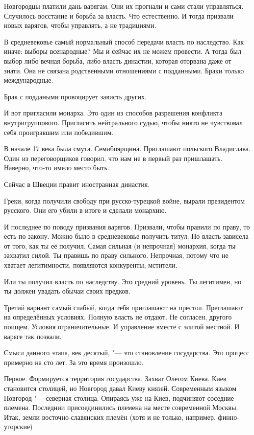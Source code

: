 Новгородцы платили дань варягам. Они их прогнали и сами стали управляться. Случилось восстание и борьба за власть. Что естественно. И тогда призвали новых варягов, чтобы управлять, а не традициями.

В средневековье самый нормальный способ передачи власть по наследство. Как иначе: выборы всенародные? Мы и сейчас их не можем провести. А тогда был выбор либо вечная борьба, либо власть династии, которая оторвана даже от знати. Она не связана родственными отношениями с подданными. Браки только международные.

Брак с поддаными провоцирует зависть других.

И вот пригласили монарха. Это один из способов разрешения конфликта внутригруппового. Пригласить нейтрального судью, чтобы никто не чувствовал себя проигравшим или победившим.

В начале 17 века была смута. Семибоярщина. Приглашают польского Владислава. Один из переговорщиков говорил, что нам не в первый раз пришлашать. Наверно, что-то имело место быть.

Сейчас в Швеции правит иностранная династия.

Греки, когда получили свободу при русско-турецкой войне, вырали президентом русского. Они его убили в итоге и сделали монархию.

И последнее по поводу призвания варягов. Призвали, чтобы правили по праву, то есть по закону. Можно было в средневековье получить титул. Но власть зависела от того, как ты её получил. Самая сильная (и непрочная) монархия, когда ты захватил силой. Ты правишь по праву сильного. Непрочная, потому что не хватает легитимности, появляются конкуренты, мстители.

Или ты получил власть по наследству. Это средний уровень. Ты легитимен, но ты должен увадать обычаи своих предков.

Третий вариант самый слабый, когда тебя приглашают на престол. Преглашают на определённых условиях. Полную власть не отдают. Не согласен, другого поищем. Условия ограничительные. И управление вместе с элитой местной. И варяге так позвали.

Смысл данного этапа, век десятый, "--- это становление государства. Это процесс примерно на сто лет. За это время произошло.

Первое. Формируется территория государства. Захват Олегом Киева. Киев становится столицей, но Новгород давал Киеву князей. Современным языком Новгород "--- северная столица. Опираясь уже на Киев, подчиняют соседние племена. Последнии присоединились племена на месте современной Москвы. Итак, земли восточно-славянских племён (хотя и не только, например, финно-угорские)

